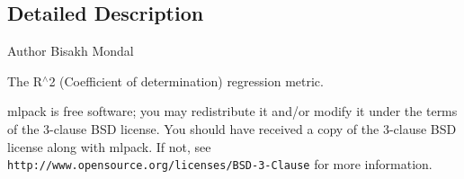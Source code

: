 \subsection{Detailed Description}
\begin{DoxyAuthor}{Author}
Bisakh Mondal
\end{DoxyAuthor}
The R$^\wedge$2 (Coefficient of determination) regression metric.

mlpack is free software; you may redistribute it and/or modify it under the terms of the 3-\/clause B\+SD license. You should have received a copy of the 3-\/clause B\+SD license along with mlpack. If not, see {\tt http\+://www.\+opensource.\+org/licenses/\+B\+S\+D-\/3-\/\+Clause} for more information. 